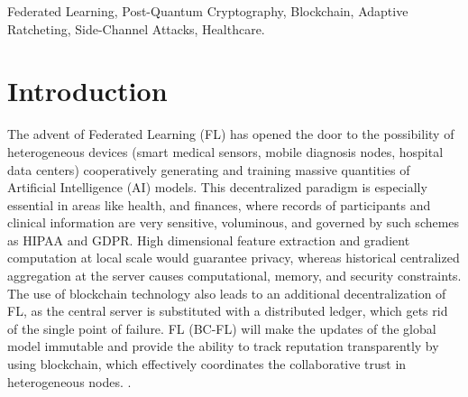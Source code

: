 \documentclass[journal, 10pt, twocolumn]{IEEEtran}
\begin{document}
\begin{abstract}
Post-Quantum Blockchain Federated Learning (PQBFL) is critical towards healthcare AI that is decentralized and secure in the quantum age. One of the most important issues to overcome is the constant nature of the symmetric ratcheting threshold L j, which compels to make a trade-off between post-compromise security and the cost of costly Kyber KEM re-keying operations. This paper presents a \textbf{Threat-Adaptive Ratcheting} mechanism that continuously adjusts $L_j$ in real time based on a composite security signal $t \in [0,1]$ derived from blockchain telemetry via exponential-decay event weighting. Under zero threat, the protocol operates at maximum efficiency ($L_j = L_{max} = 20$); under confirmed attack, it tightens automatically to $L_j = L_{min} = 2$, reducing the post-compromise exposure window by up to $10\times$ and without human intervention. We also present implementation level hardening against timing side-channel attacks and nonce-reuse attacks which are inherited by the underlying PQBFL codebase. This is the first threat-adaptive key rotation scheme that we are aware of as implemented in a post-quantum federated learning ecosystem.
\end{abstract}

\begin{IEEEkeywords}
Federated Learning, Post-Quantum Cryptography, Blockchain, Adaptive Ratcheting, Side-Channel Attacks, Healthcare.
\end{IEEEkeywords}

\section{Introduction}

The advent of Federated Learning (FL) has opened the door to the possibility of heterogeneous devices (smart medical sensors, mobile diagnosis nodes, hospital data centers) cooperatively generating and training massive quantities of Artificial Intelligence (AI) models. This decentralized paradigm is especially essential in areas like health, and finances, where records of participants and clinical information are very sensitive, voluminous, and governed by such schemes as HIPAA and GDPR. High dimensional feature extraction and gradient computation at local scale would guarantee privacy, whereas historical centralized aggregation at the server causes computational, memory, and security constraints. The use of blockchain technology also leads to an additional decentralization of FL, as the central server is substituted with a distributed ledger, which gets rid of the single point of failure. FL (BC-FL) will make the updates of the global model immutable and provide the ability to track reputation transparently by using blockchain, which effectively coordinates the collaborative trust in heterogeneous nodes.
\cite{bdfll23}.
\end{document}
